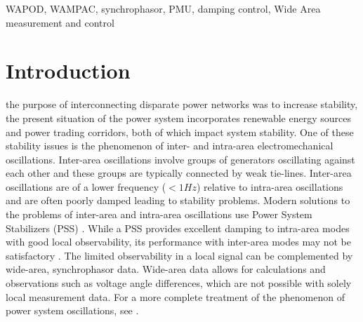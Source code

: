 \documentclass[journal]{IEEEtran}
\begin{document}
\begin{abstract}

\end{abstract}

\begin{IEEEkeywords}
WAPOD, WAMPAC, synchrophasor, PMU, damping control, Wide Area measurement and control
\end{IEEEkeywords}






%
\IEEEpeerreviewmaketitle



\section{Introduction}
 the purpose of interconnecting disparate power networks was to increase stability, the present situation of the power system incorporates renewable energy sources and power trading corridors, both of which impact system stability. One of these stability issues is the phenomenon of inter- and intra-area electromechanical oscillations\cite{KundurTwoArea}. Inter-area oscillations involve groups of generators oscillating against each other and these groups are typically connected by weak tie-lines\cite{KundurTwoArea}. Inter-area oscillations are of a lower frequency ($<1 Hz$) relative to intra-area oscillations and are often poorly damped leading to stability problems\cite{KundurTwoArea}. Modern solutions to the problems of inter-area and intra-area oscillations use Power System Stabilizers (PSS) \cite{WAPODNorway}. While a PSS provides excellent damping to intra-area modes with good local observability, its performance with inter-area modes may not be satisfactory \cite{localREMcomparison}. The limited observability in a local signal can be complemented by wide-area, synchrophasor data. Wide-area data allows for calculations and observations such as voltage angle differences, which are not possible with solely local measurement data\cite{Yuwa}. For a more complete treatment of the phenomenon of power system oscillations, see \cite{Rogers_book}.
\vspace{-1em}
\end{document}
